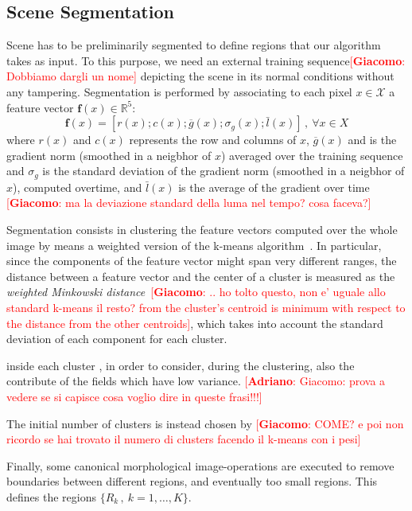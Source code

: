 \documentclass{llncs}
\newcommand{\gi}[1]{{\textcolor{red}{[\small \textbf{Giacomo}: #1]}}}
\newcommand{\ad}[1]{{\textcolor{red}{[\small \textbf{Adriano}: #1]}}}
\begin{document}
\subsection{Scene Segmentation}\label{subsec:Segmentation}
Scene has to be preliminarily segmented to define regions  that our algorithm takes as input. To this purpose, we need an external training sequence\gi{Dobbiamo dargli un nome} depicting the scene in its normal conditions without any tampering. Segmentation is performed by associating to each pixel $x\in\mathcal{X}$ a feature vector $\textbf{f}(x)\in \mathbb{R}^5$:
\begin{equation}
\label{eq:featureVector}
\textbf{f}(x)=\left[r(x);c(x);\overline{g}(x);\sigma_{g}(x);\bar{l}(x)\right]\,, \ \forall x \in X
\end{equation}
where $r(x)$ and $c(x)$ represents the row and columns of $x$, $\overline{g}(x)$ and is the gradient norm (smoothed in a neigbhor of $x$) averaged over the training sequence and $\sigma_g$ is the standard deviation of the gradient norm (smoothed in a neigbhor of $x$), computed overtime, and $\bar{l}(x)$ is the average of the gradient over time \gi{ma la deviazione standard della luma nel tempo? cosa faceva?}

Segmentation consists in clustering the feature vectors computed over the whole image by means a weighted version of the k-means algorithm~\cite{han2006data}. In particular, since the components of the feature vector might span very different ranges, the distance between a feature vector and the center of a cluster is measured as the \textit{weighted Minkowski distance}~\cite{de2012minkowski}\gi{.. ho tolto questo, non e' uguale allo standard k-means il resto? from the cluster's centroid is minimum with respect to the distance from the other centroids}, which takes into account the standard deviation of each component for each cluster. 

inside each cluster \cite{kottke1994motion}, in order to consider, during the clustering, also the contribute of the fields which have low variance. \ad{Giacomo: prova a vedere se si capisce cosa voglio dire in queste frasi!!!}

The initial number of clusters is instead chosen by \gi{COME? e poi non ricordo se hai trovato il numero di clusters facendo il k-means con i pesi}

Finally, some canonical morphological image-operations are executed to remove boundaries between different regions, and eventually too small regions. This defines the regions $\{R_k\,, \ k=1,\dots,K\}$.
\end{document}
